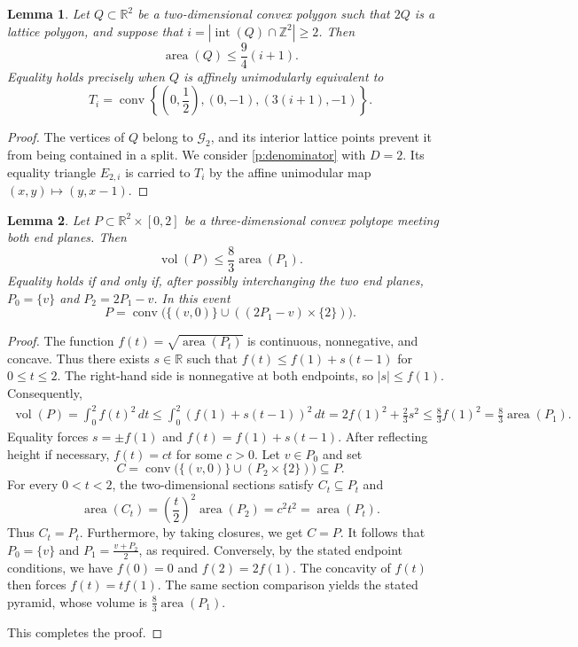 \documentclass[reqno, 11pt]{article}
\numberwithin{equation}{section}
\newtheorem{lemma}[lemma]{Lemma}
\theoremstyle{definition}
\newcommand{\R}{\mathbb R}
\newcommand{\Z}{\mathbb Z}
\DeclareMathOperator{\Int}{int}
\DeclareMathOperator{\vol}{vol}
\DeclareMathOperator{\area}{area}
\DeclareMathOperator{\conv}{conv}
\numberwithin{equation}{section}
\begin{document}
\begin{lemma}\label{w2:halfarea}
Let $Q\subset\R^2$ be a two-dimensional convex polygon such that $2Q$ is a lattice polygon, and suppose that $i=|\Int(Q)\cap\Z^2|\ge2$.  Then
\begin{equation}\label{w2:area}
 \area(Q)\le\frac94(i+1).
\end{equation}
Equality holds precisely when $Q$ is affinely unimodularly equivalent to
\[
 T_i=\conv\left\{\left(0,\frac12\right),(0,-1),(3(i+1),-1)\right\}.
\]
\end{lemma}
\begin{proof}
The vertices of $Q$ belong to $\mathcal G_2$, and its interior lattice
points prevent it from being contained in a split. We consider \cref{p:denominator} with $D=2$. Its equality triangle $E_{2,i}$
is carried to $T_i$ by the affine unimodular map $(x,y)\mapsto(y,x-1)$.
\end{proof}

\begin{lemma}\label{w2:middle}
Let $P\subset\R^2\times[0,2]$ be a three-dimensional convex polytope meeting both end planes.
Then
\begin{equation}\label{w2:middlebound}
 \vol(P)\le\frac83\area(P_1).
\end{equation}
Equality holds if and only if, after possibly interchanging the two end planes, $P_0=\{v\}$ and $P_2=2P_1-v$. 
In this event
\[
 P=\conv\bigl(\{(v,0)\}\cup((2P_1-v)\times\{2\})\bigr).
\]
\end{lemma}
\begin{proof}
The function $f(t)=\sqrt{\area(P_t)}$ is continuous, nonnegative,
and concave. Thus there exists $s\in\R$ such that
$f(t)\le f(1)+s(t-1)$ for $0\le t\le2$.
The right-hand side is nonnegative at both endpoints, so $|s|\le f(1)$.
Consequently,
\begin{align*}
 \vol(P)=\int_0^2 f(t)^2\,dt\le\int_0^2\left(f(1)+s(t-1)\right)^2\,dt
 =2f(1)^2+\frac23s^2\le\frac83f(1)^2=\frac83\area(P_1).
\end{align*}
Equality forces $s=\pm f(1)$ and $f(t)=f(1)+s(t-1)$.
After reflecting height if necessary, $f(t)=ct$ for some $c>0$.
Let $v\in P_0$ and set
\[
 C=\conv\bigl(\{(v,0)\}\cup(P_2\times\{2\})\bigr)\subseteq P.
\]
For every $0<t<2$, the two-dimensional sections satisfy
$C_t\subseteq P_t$ and
\[
 \area(C_t)=\left(\frac{t}{2}\right)^2\area(P_2)=c^2t^2=\area(P_t).
\]
Thus $C_t=P_t$. Furthermore, by taking closures, we get $C=P$.
It follows that $P_0=\{v\}$ and $P_1=\frac{v+P_2}{2}$, as required.
Conversely, by the stated endpoint conditions, we have $f(0)=0$ and $f(2)=2f(1)$. 
The concavity of $f(t)$ then forces $f(t)=t f(1)$. The same section comparison yields the stated pyramid, whose volume is \(\frac83\operatorname{area}(P_1)\).

This completes the proof.
\end{proof}
\end{document}

